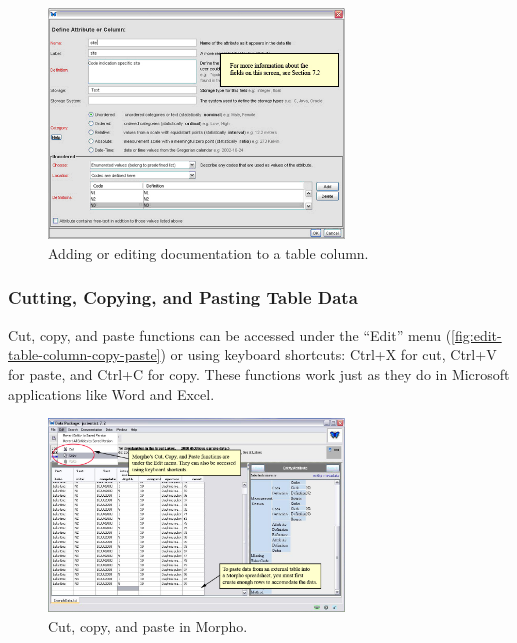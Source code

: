 \begin{figure}
  \centering
    \includegraphics[width=0.7\textwidth]{images/edit-table-column-documentation.jpg}
  \caption{Adding or editing documentation to a table column.}
  \label{fig:edit-table-column-documentation}
\end{figure}

\subsubsection{Cutting, Copying, and Pasting Table Data}
\label{sec:edit-table-col-copypaste}

Cut, copy, and paste functions can be accessed under the ``Edit'' menu
(\autoref{fig:edit-table-column-copy-paste}) or using keyboard
shortcuts: Ctrl+X for cut, Ctrl+V for paste, and Ctrl+C for copy. These
functions work just as they do in Microsoft applications like Word and
Excel.

\begin{figure}
  \centering
    \includegraphics[width=0.7\textwidth]{images/edit-table-column-copy-paste.jpg}
  \caption{Cut, copy, and paste in Morpho.}
  \label{fig:edit-table-column-copy-paste}
\end{figure}


